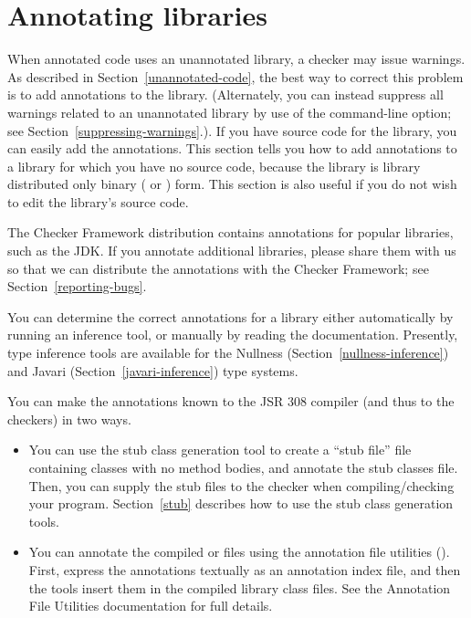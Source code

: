 \htmlhr
\section{Annotating libraries\label{annotating-libraries}}

When annotated code uses an unannotated library, a checker may issue warnings.
As described in Section~\ref{unannotated-code}, the best way to correct
this problem is to add annotations to the library.  (Alternately, you can instead
suppress all warnings related to an unannotated library by use of the 
 command-line option; see
Section~\ref{suppressing-warnings}.).  If you have source code for the
library, you can easily add the annotations.
This section tells you
how to add annotations to a library for which you have no source code,
because the library is library distributed only binary ( or
) form.  This section is also useful if you do not wish to edit the
library's source code.

The Checker Framework distribution contains annotations
for popular libraries, such as the JDK\@.
If you annotate additional libraries, please share them with us so that we
can distribute the annotations with the Checker Framework; see
Section~\ref{reporting-bugs}.


You can determine the correct annotations for a library either
automatically by running an inference tool, or manually by reading the
documentation.  Presently, type inference tools are available for the
Nullness (Section~\ref{nullness-inference}) and Javari
(Section~\ref{javari-inference}) type systems.

You can make the annotations known to the JSR 308 compiler (and thus
to the checkers) in two ways.

\begin{itemize}

\item You can use the stub class generation tool to create a ``stub
  file'' file containing classes with no method bodies,
  and annotate the stub classes
  file.  Then, you can supply the stub files to the checker when
  compiling/checking your program.
  Section~\ref{stub} describes how to use the stub class generation
  tools.

\item You can annotate the compiled
   or  files using the annotation file utilities
  ().
  First, express the annotations textually as an annotation index file, and
  then the tools insert them in the compiled library class files.
  See the Annotation File Utilities documentation for full details.

\end{itemize}


